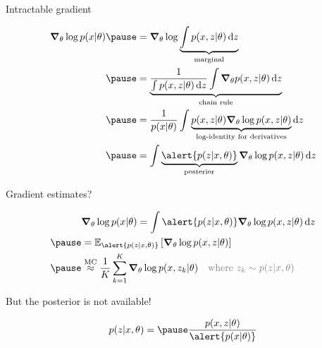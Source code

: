 \documentclass[14pt]{beamer}
\begin{document}
\begin{frame}{Intractable gradient}

\begin{small}
\begin{equation*}
\begin{aligned}
\grad_\theta \log p(x|\theta) \pause &= \grad_\theta \log \underbrace{\int p(x, z|\theta) \dd{z}}_{\text{marginal}} \\ \pause
&= \underbrace{\frac{1}{\int p(x, z|\theta) \dd{z}} \int \grad_\theta p(x,z|\theta) \dd{z}}_{\text{chain rule}} \\ \pause
&= \frac{1}{p(x|\theta)} \int \underbrace{p(x,z|\theta) \grad_\theta \log p(x,z|\theta)}_{\text{log-identity for derivatives}} \dd{z} \\ \pause
&= \int \underbrace{\alert{p(z|x, \theta)}}_{\text{posterior}} \grad_\theta \log p(x,z|\theta) \dd{z} %
\end{aligned}
\end{equation*}
\end{small}



\end{frame}

\begin{frame}{Gradient estimates?}

\begin{equation*}
\begin{aligned}
&\grad_\theta \log p(x|\theta) = \int \alert{p(z|x, \theta)} \grad_\theta \log p(x,z|\theta) \dd{z} \\ \pause
&= \mathbb E_{\alert{p(z|x, \theta)}} \left[ \grad_\theta \log p(x,z|\theta) \right] \\ \pause
&\overset{\text{MC}}{\approx} \frac{1}{K} \sum_{k=1}^K \grad_\theta \log p(x, z_k|\theta) 
\quad \textcolor{gray}{\text{where }z_k \sim p(z|x, \theta)}
\end{aligned}
\end{equation*}

\pause But the posterior is not available!

\begin{equation*}
\begin{aligned}
	p(z|x, \theta) = \pause \frac{p(x, z|\theta)}{\alert{p(x|\theta)}} %
\end{aligned}
\end{equation*}

\end{frame}
\end{document}
